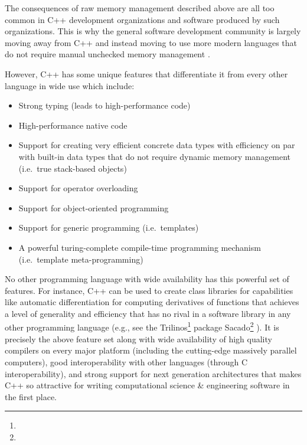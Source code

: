 \documentclass[pdf,ps2pdf,11pt]{SANDreport}
\begin{document}
The consequences of raw memory management described above are all too
common in C++ development organizations and software produced by such
organizations.  This is why the general software development community
is largely moving away from C++ and instead moving to use more modern
languages that do not require manual unchecked memory management
{}\cite{DomainDrivenDesignQuickly}.

However, C++ has some unique features that differentiate it from every
other language in wide use which include:

\begin{itemize}

{}\item Strong typing (leads to high-performance code)

{}\item High-performance native code

{}\item Support for creating very efficient concrete data types with
efficiency on par with built-in data types that do not require dynamic
memory management (i.e.\ true stack-based objects)

{}\item Support for operator overloading

{}\item Support for object-oriented programming

{}\item Support for generic programming (i.e.\ templates)

{}\item A powerful turing-complete compile-time programming mechanism
(i.e.\ template meta-programming)

\end{itemize}

No other programming language with wide availability has this powerful
set of features.  For instance, C++ can be used to create class
libraries for capabilities like automatic differentiation
{}\cite{ref:ad} for computing derivatives of functions that achieves a
level of generality and efficiency that has no rival in a software
library in any other programming language (e.g., see the
Trilinos\footnote{} package
Sacado\footnote{}
{}\cite{phippsEtAl2006}).  It is precisely the above feature set along
with wide availability of high quality compilers on every major
platform (including the cutting-edge massively parallel computers),
good interoperability with other languages (through C
interoperability), and strong support for next generation
architectures {}\cite{DesignIssuesForMultiCore08} that makes C++ so
attractive for writing computational science \& engineering software
in the first place.
\end{document}
